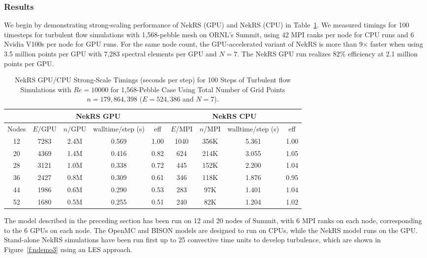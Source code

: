 \subsubsection{Results}
We begin by demonstrating strong-scaling performance of NekRS (GPU) and NekRS (CPU) in Table~\ref{tab:nekrs}.
We measured timings for 100 timesteps for turbulent flow simulations with 1,568-pebble mesh on ORNL’s Summit, 
using 42 MPI ranks per node for CPU runs and 6 Nvidia V100s per node for GPU runs. 
For the same node count, the GPU-accelerated variant of NekRS is more than 9$\times$ faster when using
3.5 million points per GPU with 7,283 spectral elements per GPU and $N=7$. 
The NekRS GPU run realizes 82\% efficiency at 2.1 million points per GPU.


\begin{table}
  \centering
  \begin{tabular}{c|cccc||cccc}
    \hline 
  \multicolumn{1}{c|}{ } &
  \multicolumn{4}{|c||}{NekRS GPU}  &
  \multicolumn{4}{|c}{NekRS CPU} \\
  \hline
    Nodes  &  $E$/GPU & $n$/GPU & walltime/step (s) & eff & $E$/MPI& $n$/MPI & walltime/step (s) & eff\\
  \hline
    12 & 7283 & 2.4M & 0.569 & 1.00 & 1040 & 356K & 5.361  & 1.00\\
    20 & 4369 & 1.4M & 0.416 & 0.82 & 624 & 214K  & 3.055  & 1.05\\
    28 & 3121 & 1.0M & 0.338 & 0.72 & 445 & 152K & 2.200  & 1.04\\
    36 & 2427 & 0.8M & 0.309 & 0.61 & 346 & 118K & 1.876  & 0.95\\
    44 & 1986 & 0.6M & 0.290 & 0.53 & 283 & 97K & 1.401  & 1.04\\
    52 & 1680 & 0.5M & 0.255 & 0.51 & 240 & 82K & 1.204  & 1.02\\
    \hline \hline
  \end{tabular}
  \caption{NekRS GPU/CPU Strong-Scale Timings (seconds per step) for 100 Steps of Turbulent flow Simulations
   with $Re=10000$ for 1,568-Pebble Case Using Total Number of Grid Points $n=179,864,398$ ($E=524,386$ and $N=7$).} 
  \label{tab:nekrs}
\end{table}

The model described in the preceding section has been run on 12 and 20 nodes of Summit, with 6 MPI ranks on each node, corresponding to the 6 GPUs on each node. The OpenMC and BISON models are designed to run on CPUs, while the NekRS model runs on the GPU. Stand-alone NekRS simulations have been run first up to 25 convective time units to develop turbulence, which are shown in Figure~\ref{f:ndemo3} using an LES approach.

